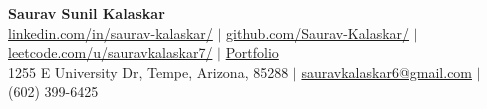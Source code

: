 \documentclass[letterpaper,10pt]{article}
\begin{document}
\setlength{\parindent}{0pt}
\setlength{\parskip}{0pt}
\setlength{\rightskip}{0.25em}

\begin{center}
    {\Huge \textbf{Saurav Sunil Kalaskar}}\\[2pt]

    \href{http://www.linkedin.com/in/saurav-kalaskar}{linkedin.com/in/saurav-kalaskar/} $|$
    \href{https://github.com/Saurav-Kalaskar}{github.com/Saurav-Kalaskar/} $|$
    \href{https://leetcode.com/u/sauravkalaskar7/}{leetcode.com/u/sauravkalaskar7/} $|$
    \href{https://www.saurav-kalaskar.me/}{Portfolio}
    \\
    1255 E University Dr, Tempe, Arizona, 85288 $|$
    \href{mailto:sauravkalaskar6@gmail.com}{sauravkalaskar6@gmail.com} $|$
    (602) 399-6425
\end{center}
\end{document}
